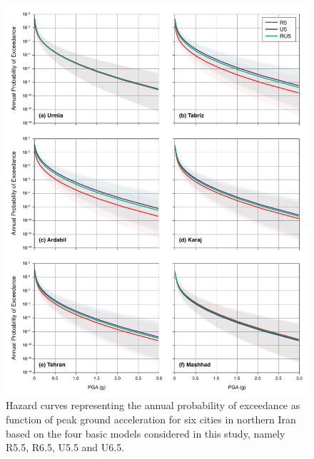 \begin{figure}[th!]
    \centering
    \includegraphics[width=\textwidth]{figures/pdf/figure-11} 
    \caption{Hazard curves representing the annual probability of exceedance as function of peak ground acceleration for six cities in northern Iran based on the four basic models considered in this study, namely R5.5, R6.5, U5.5 and U6.5.}
    \label{fig:hazardcurve}
\end{figure}

